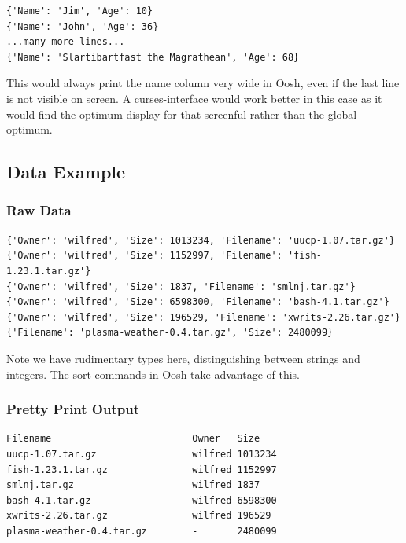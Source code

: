 \documentclass[12pt,twoside,notitlepage]{report}
\begin{document}
\begin{verbatim}
{'Name': 'Jim', 'Age': 10}
{'Name': 'John', 'Age': 36}
...many more lines...
{'Name': 'Slartibartfast the Magrathean', 'Age': 68}
\end{verbatim}

This would always print the name column very wide in Oosh, even if the last
line is not visible on screen. A curses-interface would work better in
this case as it would find the optimum display for that screenful
rather than the global optimum.



\subsection{Data Example}
\subsubsection{Raw Data}
\label{rawdata}
\begin{verbatim}
{'Owner': 'wilfred', 'Size': 1013234, 'Filename': 'uucp-1.07.tar.gz'}
{'Owner': 'wilfred', 'Size': 1152997, 'Filename': 'fish-1.23.1.tar.gz'}
{'Owner': 'wilfred', 'Size': 1837, 'Filename': 'smlnj.tar.gz'}
{'Owner': 'wilfred', 'Size': 6598300, 'Filename': 'bash-4.1.tar.gz'}
{'Owner': 'wilfred', 'Size': 196529, 'Filename': 'xwrits-2.26.tar.gz'}
{'Filename': 'plasma-weather-0.4.tar.gz', 'Size': 2480099}
\end{verbatim}
Note we have rudimentary types here, distinguishing between strings and
integers. The sort commands in Oosh take advantage of this.

\subsubsection{Pretty Print Output}
\begin{verbatim}
Filename                         Owner   Size      
uucp-1.07.tar.gz                 wilfred 1013234   
fish-1.23.1.tar.gz               wilfred 1152997   
smlnj.tar.gz                     wilfred 1837      
bash-4.1.tar.gz                  wilfred 6598300   
xwrits-2.26.tar.gz               wilfred 196529    
plasma-weather-0.4.tar.gz        -       2480099
\end{verbatim}
\end{document}
